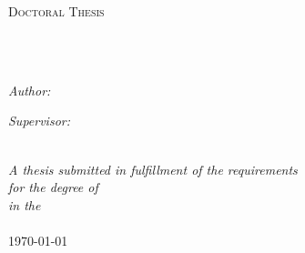 \documentclass[
12pt, %
english, %
onehalfspacing, %
headsepline, %
]{MastersDoctoralThesis} %
\author{Yan \textsc{Ju}} %
\begin{document}
\frontmatter %

\pagestyle{plain} %


\begin{titlepage}
\begin{center}

{\scshape\LARGE \univname\par}\vspace{1.5cm} %
\textsc{\Large Doctoral Thesis}\\[0.5cm] %

\HRule \\[0.4cm] %
{\huge \bfseries \ttitle\par}\vspace{0.4cm} %
\HRule \\[1.5cm] %
 
\begin{minipage}[t]{0.4\textwidth}
\begin{flushleft} \large
\emph{Author:}\\
{\authorname} %
\end{flushleft}
\end{minipage}
\begin{minipage}[t]{0.4\textwidth}
\begin{flushright} \large
\emph{Supervisor:} \\
{\supname} %
\end{flushright}
\end{minipage}\\[3cm]
 
\large \textit{A thesis submitted in fulfillment of the requirements\\ for the degree of \degreename}\\[0.3cm] %
\textit{in the}\\[0.4cm]
\deptname\\[2cm] %
 
{\large \today}\\[4cm] %
 
\vfill
\end{center}
\end{titlepage}
\end{document}
